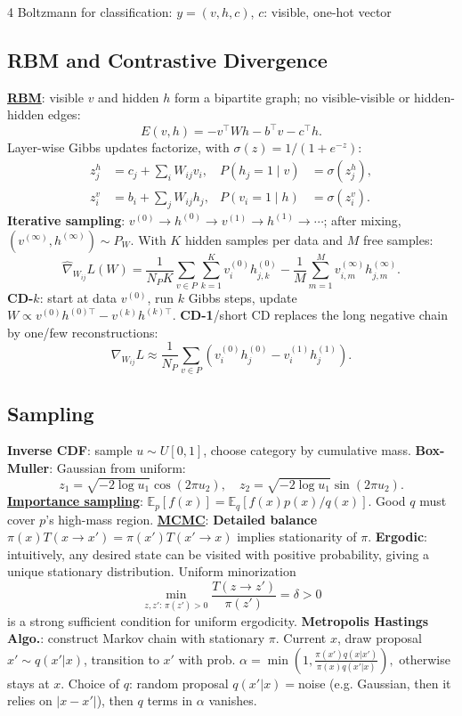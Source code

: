 \documentclass{article}
\newcommand{\key}[1]{\textbf{#1}}
\newcommand{\lowterm}[1]{\textbf{\underline{#1}}}
\newcommand{\E}{\mathbb{E}}
\newcommand{\1}{\mathbf 1}
\begin{document}
\begin{multicols*}{4}
Boltzmann for classification: $y=(v,h,c)$, $c$: visible, one-hot vector


\subsection{RBM and Contrastive Divergence}
\lowterm{RBM}: visible $v$ and hidden $h$ form a bipartite graph; no visible-visible or hidden-hidden edges:
\[
E(v,h)=-v^\top Wh-b^\top v-c^\top h.
\]
Layer-wise Gibbs updates factorize, with $\sigma(z)=1/(1+e^{-z})$:
\[
\begin{aligned}
z^h_j&=c_j+\sum_iW_{ij}v_i, & P(h_j=1\mid v)&=\sigma(z^h_j),\\
z^v_i&=b_i+\sum_jW_{ij}h_j, & P(v_i=1\mid h)&=\sigma(z^v_i).
\end{aligned}
\]
\key{Iterative sampling}: $v^{(0)}\to h^{(0)}\to v^{(1)}\to h^{(1)}\to\cdots$; after mixing, $(v^{(\infty)},h^{(\infty)})\sim P_W$. With $K$ hidden samples per data and $M$ free samples:
\[
\widehat{\nabla}_{W_{ij}}L(W)=
\frac1{N_PK}\sum_{v\in P}\sum_{k=1}^{K}v_i^{(0)}h_{j,k}^{(0)}
-\frac1M\sum_{m=1}^{M}v_{i,m}^{(\infty)}h_{j,m}^{(\infty)}.
\]
\key{CD-$k$}: start at data $v^{(0)}$, run $k$ Gibbs steps, update $W\propto v^{(0)}h^{(0)\top}-v^{(k)}h^{(k)\top}$. \key{CD-1}/short CD replaces the long negative chain by one/few reconstructions:
\[
\nabla_{W_{ij}}L\approx\frac1{N_P}\sum_{v\in P}
\left(v_i^{(0)}h_j^{(0)}-v_i^{(1)}h_j^{(1)}\right).
\]

\subsection{Sampling}
\key{Inverse CDF}: sample $u\sim U[0,1]$, choose category by cumulative mass. \key{Box-Muller}: Gaussian from uniform:
\[
z_1=\sqrt{-2\log u_1}\cos(2\pi u_2),\quad z_2=\sqrt{-2\log u_1}\sin(2\pi u_2).
\]
\lowterm{Importance sampling}: $\E_p[f(x)]=\E_q[f(x)p(x)/q(x)]$. Good $q$ must cover $p$'s high-mass region.
\lowterm{MCMC}: \key{Detailed balance} $\pi(x)T(x\to x')=\pi(x')T(x'\to x)$ implies stationarity of $\pi$. \key{Ergodic}: intuitively, any desired state can be visited with positive probability, giving a unique stationary distribution. Uniform minorization
\[
\min_{z,z':\,\pi(z')>0}\frac{T(z\to z')}{\pi(z')}=\delta>0
\]
is a strong sufficient condition for uniform ergodicity. \key{Metropolis Hastings Algo.}: construct Markov chain with stationary $\pi$. Current $x$, draw proposal $x'\sim q(x'|x)$, transition to $x'$ with prob. 
\(
\alpha=\min\left(1,\frac{\pi(x')q(x|x')}{\pi(x)q(x'|x)}\right),
\)
otherwise stays at $x$. 
Choice of $q$: random proposal $q(x'|x)=$noise (e.g. Gaussian, then it relies on $|x-x'|$), then $q$ terms in $\alpha$ vanishes. 


\end{multicols*}
\end{document}
